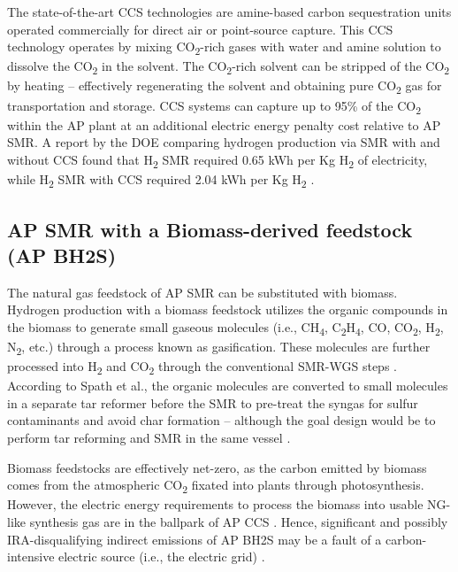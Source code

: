 \documentclass{article}
\begin{document}
The state-of-the-art CCS technologies are amine-based carbon sequestration units operated commercially for direct air or point-source capture. This CCS technology operates by mixing CO\textsubscript{2}-rich gases with water and amine solution to dissolve the CO\textsubscript{2} in the solvent. The CO\textsubscript{2}-rich solvent can be stripped of the CO\textsubscript{2} by heating – effectively regenerating the solvent and obtaining pure CO\textsubscript{2} gas for transportation and storage. CCS systems can capture up to 95\% of the CO\textsubscript{2} within the AP plant at an additional electric energy penalty cost relative to AP SMR. A report by the DOE comparing hydrogen production via SMR with and without CCS found that H\textsubscript{2} SMR required 0.65 kWh per Kg H\textsubscript{2} of electricity, while H\textsubscript{2} SMR with CCS required 2.04 kWh per Kg H\textsubscript{2} \cite{LEWIS2022}.

\subsection{AP SMR with a Biomass-derived feedstock (AP BH2S)}

The natural gas feedstock of AP SMR can be substituted with biomass. Hydrogen production with a biomass feedstock utilizes the organic compounds in the biomass to generate small gaseous molecules (i.e., CH\textsubscript{4}, C\textsubscript{2}H\textsubscript{4}, CO, CO\textsubscript{2}, H\textsubscript{2}, N\textsubscript{2}, etc.) through a process known as gasification. These molecules are further processed into H\textsubscript{2} and CO\textsubscript{2} through the conventional SMR-WGS steps \cite{Arora2017, Tock2013, TUNA2014}. According to Spath et al., the organic molecules are converted to small molecules in a separate tar reformer before the SMR to pre-treat the syngas for sulfur contaminants and avoid char formation – although the goal design would be to perform tar reforming and SMR in the same vessel \cite{Spath2005}.

Biomass feedstocks are effectively net-zero, as the carbon emitted by biomass comes from the atmospheric CO\textsubscript{2} fixated into plants through photosynthesis. However, the electric energy requirements to process the biomass into usable NG-like synthesis gas are in the ballpark of AP CCS \cite{LEWIS2022, Spath2005}. Hence, significant and possibly IRA-disqualifying indirect emissions of AP BH2S may be a fault of a carbon-intensive electric source (i.e., the electric grid) \cite{EIA2023b}.
\end{document}

